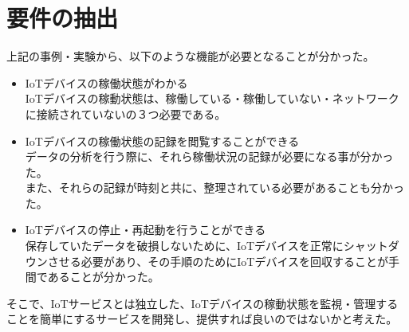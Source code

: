 \section{要件の抽出}
上記の事例・実験から、以下のような機能が必要となることが分かった。

\begin{itemize}
\item IoTデバイスの稼働状態がわかる\\
	IoTデバイスの稼動状態は、稼働している・稼働していない・ネットワークに接続されていないの３つ必要である。
\item IoTデバイスの稼働状態の記録を閲覧することができる\\
	データの分析を行う際に、それら稼働状況の記録が必要になる事が分かった。\\
	また、それらの記録が時刻と共に、整理されている必要があることも分かった。
\item IoTデバイスの停止・再起動を行うことができる\\
	保存していたデータを破損しないために、IoTデバイスを正常にシャットダウンさせる必要があり、その手順のためにIoTデバイスを回収することが手間であることが分かった。
\end{itemize}

そこで、IoTサービスとは独立した、IoTデバイスの稼動状態を監視・管理することを簡単にするサービスを開発し、提供すれば良いのではないかと考えた。




